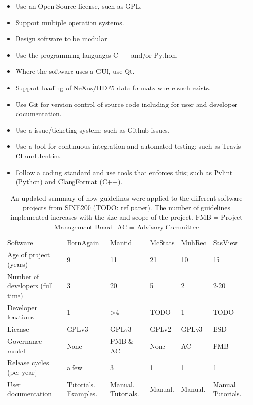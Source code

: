 \documentclass[jnr]{iosart2x}
\begin{document}
\begin{itemize}
      \item Use an Open Source license, such as GPL.
      \item Support multiple operation systems.
      \item Design software to be modular.
      \item Use the programming languages C++ and/or Python.
      \item Where the software uses a GUI, use Qt.
      \item Support loading of NeXus/HDF5 data formats where such exists.
      \item Use Git for version control of source code including for user and developer documentation.
      \item Use a issue/ticketing system; such as Github issues.
      \item Use a tool for continuous integration and automated testing; such as Travis-CI and Jenkins
      \item Follow a coding standard and use tools that enforces this; such as Pylint (Python) and ClangFormat (C++).
\end{itemize}
\begin{table}
 \begin{tabular}{llllll}
 Software                        & BornAgain \cite{}  & Mantid \cite{} &McStats \cite{}  &MuhRec \cite{} & SasView \cite{} \\
 Age of project (years)          & 9 & 11 & 21 & 10 & 15 \\
 Number of developers (full time)& 3 & 20 & 5 & 2 & 2-20 \\
 Developer locations             & 1 & >4 & TODO & 1 & TODO \\
 License                         & GPLv3 & GPLv3 & GPLv2 & GPLv3 & BSD \\
 Governance model                & None & PMB \& AC  & None & AC & PMB \\
 Release cycles (per year)       & a few & 3 & 1 & 1 & 1\\
 User documentation              & Tutorials. Examples. & Manual. Tutorials. & Manual. & Manual. & Manual. Tutorials.
 \end{tabular}
 \caption{An updated summary of how guidelines were applied to the different software projects from SINE200 \cite{} (TODO: ref paper). The number of guidelines implemented increases with the size
and scope of the project. PMB = Project Management Board. AC = Advisory Committee}
\label{summaryTable}
\end{table}
\end{document}
